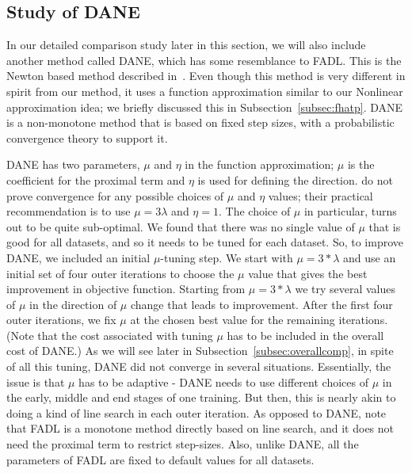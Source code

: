 \documentclass[twoside, 11pt]{article}
\begin{document}

\subsection{Study of DANE}
\label{subsec:dane}

In our detailed comparison study later in this section, we will also include another method called DANE, which has some resemblance to FADL. This is the Newton based method described in~\citet{sharir2014}. Even though this method is very different in spirit from our method, it uses a function approximation similar to our Nonlinear approximation idea; we briefly discussed this in Subsection~\ref{subsec:fhatp}. DANE is a non-monotone method that is based on fixed step sizes, with a probabilistic convergence theory to support it.

DANE has two parameters, $\mu$ and $\eta$ in the function approximation; $\mu$ is the coefficient for the proximal term and $\eta$ is used for defining the direction. \citet{sharir2014} do not prove convergence for any possible choices of $\mu$ and $\eta$ values; their practical recommendation is to use $\mu=3\lambda$ and $\eta=1$. The choice of $\mu$ in particular, turns out to be quite sub-optimal. We found that there was no single value of $\mu$ that is good for all datasets, and so it needs to be tuned for each dataset. So, to improve DANE, we included an initial $\mu$-tuning step. We start with $\mu=3*\lambda$ and use an initial set of four outer iterations to choose the $\mu$ value that gives the best improvement in objective function. Starting from $\mu=3*\lambda$ we try several values of $\mu$ in the direction of $\mu$ change that leads to improvement. After the first four outer iterations, we fix $\mu$ at the chosen best value for the remaining iterations. (Note that the cost associated with tuning $\mu$ has to be included in the overall cost of DANE.) As we will see later in Subsection~\ref{subsec:overallcomp}, in spite of all this tuning, DANE did not converge in several situations. Essentially, the issue is that $\mu$ has to be adaptive - DANE needs to use different choices of $\mu$ in the early, middle and end stages of one training. But then, this is nearly akin to doing a kind of line search in each outer iteration. As opposed to DANE, note that FADL is a monotone method directly based on line search, and it does not need the proximal term to restrict step-sizes. Also, unlike DANE, all the parameters of FADL are fixed to default values for all datasets.
\end{document}
